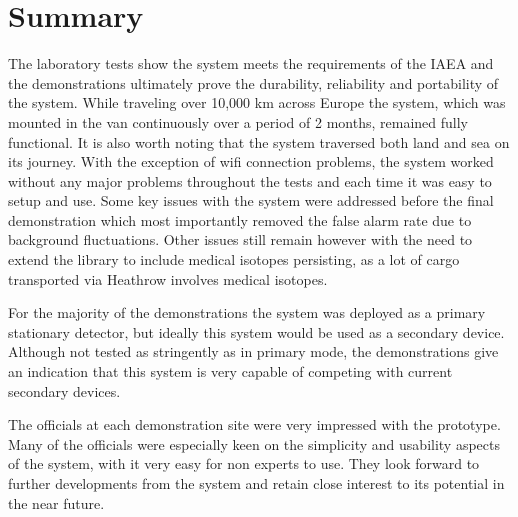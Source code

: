 \section{Summary}
The laboratory tests show the system meets the requirements of the IAEA and the demonstrations ultimately prove the durability, reliability and portability of the system. While traveling over 10,000 km across Europe the system, which was mounted in the van continuously over a period of 2 months, remained fully functional. It is also worth noting that the system traversed both land and sea on its journey. With the exception of wifi connection problems, the system worked without any major problems throughout the tests and each time it was easy to setup and use. Some key issues with the system were addressed before the final demonstration which most importantly removed the false alarm rate due to background fluctuations. Other issues still remain however with the need to extend the library to include medical isotopes persisting, as a lot of cargo transported via Heathrow involves medical isotopes.

For the majority of the demonstrations the system was deployed as a primary stationary detector, but ideally this system would be used as a secondary device. Although not tested as stringently as in primary mode, the demonstrations give an indication that this system is very capable of competing with current secondary devices.

The officials at each demonstration site were very impressed with the prototype. Many of the officials were especially keen on the simplicity and usability aspects of the system, with it very easy for non experts to use. They look forward to further developments from the system and retain close interest to its potential in the near future. 
